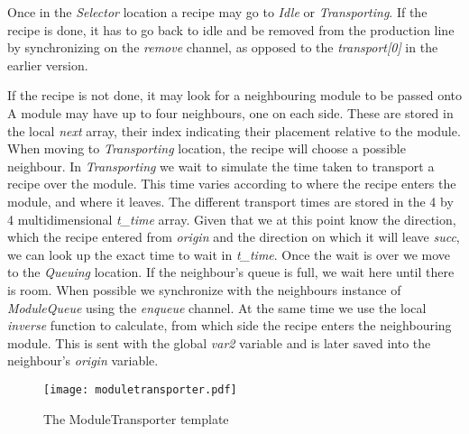 Once in the \emph{Selector} location a recipe may go to \emph{Idle} or \emph{Transporting}. If the recipe is done, it has to go back to idle and be removed from the production line by synchronizing on the \emph{remove} channel, as opposed to the \emph{transport[0]} in the earlier version.

If the recipe is not done, it may look for a neighbouring module to be passed onto A module may have up to four neighbours, one on each side. These are stored in the local \emph{next} array, their index indicating their placement relative to the module. When moving to \emph{Transporting} location, the recipe will choose a possible neighbour. In \emph{Transporting} we wait to simulate the time taken to transport a recipe over the module. This time varies according to where the recipe enters the module, and where it leaves. The different transport times are stored in the 4 by 4 multidimensional \emph{t\_time} array. Given that we at this point know the direction, which the recipe entered from \emph{origin} and the direction on which it will leave \emph{succ}, we can look up the exact time to wait in \emph{t\_time}. Once the wait is over we move to the \emph{Queuing} location. If the neighbour's queue is full, we wait here until there is room. When possible we synchronize with the neighbours instance of \emph{ModuleQueue} using the \emph{enqueue} channel. At the same time we use the local \emph{inverse} function to calculate, from which side the recipe enters the neighbouring module. This is sent with the global \emph{var2} variable and is later saved into the neighbour's \emph{origin} variable. 

\begin{figure}[h]
\centering
\texttt{[image: moduletransporter.pdf]}
\caption{The ModuleTransporter template}
\label{fig:moduletransporter}
\end{figure}




